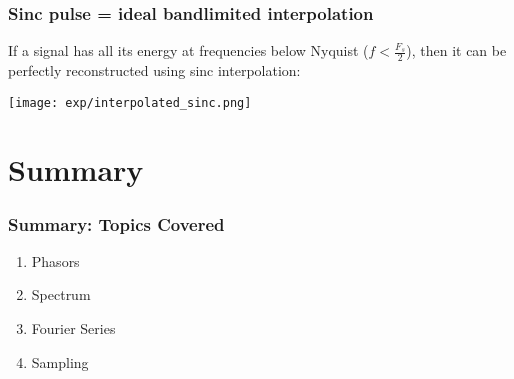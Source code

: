 \documentclass{beamer}
\begin{document}
\begin{frame}
  \frametitle{Sinc pulse = ideal bandlimited interpolation}

  If a signal has all its energy at frequencies below Nyquist ($f< \frac{F_s}{2}$), then
  it can be perfectly reconstructed using sinc interpolation:

  \centerline{\texttt{[image: exp/interpolated\_sinc.png]}}  
\end{frame}


\section[Summary]{Summary}
\setcounter{subsection}{1}

\begin{frame}
  \frametitle{Summary: Topics Covered}

  \begin{enumerate}
  \item Phasors
  \item Spectrum
  \item Fourier Series
  \item Sampling
  \end{enumerate}
\end{frame}
\end{document}
